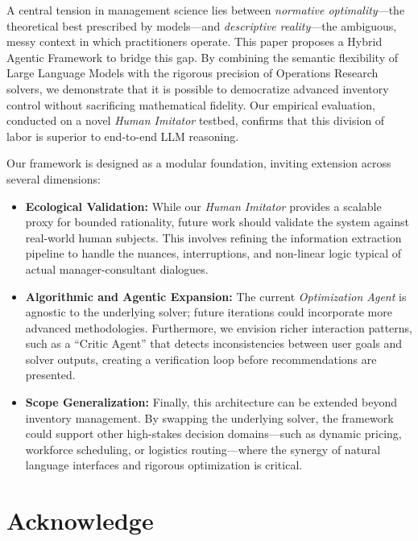 \documentclass[mnsc,nonblindrev]{informs3_hide}
\begin{document}
A central tension in management science lies between \emph{normative optimality}—the theoretical best prescribed by models—and \emph{descriptive reality}—the ambiguous, messy context in which practitioners operate. This paper proposes a Hybrid Agentic Framework to bridge this gap. By combining the semantic flexibility of Large Language Models with the rigorous precision of Operations Research solvers, we demonstrate that it is possible to democratize advanced inventory control without sacrificing mathematical fidelity.
Our empirical evaluation, conducted on a novel \emph{Human Imitator} testbed, confirms that this division of labor is superior to end-to-end LLM reasoning.


Our framework is designed as a modular foundation, inviting extension across several dimensions:

\begin{itemize}\item \textbf{Ecological Validation:} While our \emph{Human Imitator} provides a scalable proxy for bounded rationality, future work should validate the system against real-world human subjects. This involves refining the information extraction pipeline to handle the nuances, interruptions, and non-linear logic typical of actual manager-consultant dialogues.\item \textbf{Algorithmic and Agentic Expansion:} The current \emph{Optimization Agent} is agnostic to the underlying solver; future iterations could incorporate more advanced methodologies. Furthermore, we envision richer interaction patterns, such as a ``Critic Agent'' that detects inconsistencies between user goals and solver outputs, creating a verification loop before recommendations are presented.

\item \textbf{Scope Generalization:} Finally, this architecture can be extended beyond inventory management. By swapping the underlying solver, the framework could support other high-stakes decision domains—such as dynamic pricing, workforce scheduling, or logistics routing—where the synergy of natural language interfaces and rigorous optimization is critical.
\end{itemize}





\section*{Acknowledge}
\end{document}
